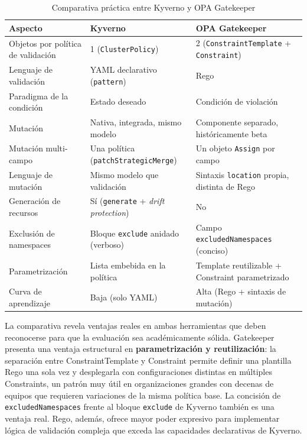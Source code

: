 \begin{table}[H]
\centering
\caption{Comparativa práctica entre Kyverno y OPA Gatekeeper}
\label{tab:kyverno-gatekeeper}
\small
\begin{tabular}{p{4.2cm} p{4.5cm} p{4.5cm}}
\toprule
\textbf{Aspecto} & \textbf{Kyverno} & \textbf{OPA Gatekeeper} \\
\midrule
Objetos por política de validación & 1 (\texttt{ClusterPolicy}) & 2 (\texttt{ConstraintTemplate} + \texttt{Constraint}) \\
\addlinespace
Lenguaje de validación & YAML declarativo (\texttt{pattern}) & Rego \\
\addlinespace
Paradigma de la condición & Estado deseado & Condición de violación \\
\addlinespace
Mutación & Nativa, integrada, mismo modelo & Componente separado, históricamente beta \\
\addlinespace
Mutación multi-campo & Una política (\texttt{patchStrategicMerge}) & Un objeto \texttt{Assign} por campo \\
\addlinespace
Lenguaje de mutación & Mismo modelo que validación & Sintaxis \texttt{location} propia, distinta de Rego \\
\addlinespace
Generación de recursos & Sí (\texttt{generate} + \textit{drift protection}) & No \\
\addlinespace
Exclusión de namespaces & Bloque \texttt{exclude} anidado (verboso) & Campo \texttt{excludedNamespaces} (conciso) \\
\addlinespace
Parametrización & Lista embebida en la política & Template reutilizable + Constraint parametrizado \\
\addlinespace
Curva de aprendizaje & Baja (solo YAML) & Alta (Rego + sintaxis de mutación) \\
\bottomrule
\end{tabular}
\end{table}

La comparativa revela ventajas reales en ambas herramientas que deben reconocerse para que la evaluación sea académicamente sólida. Gatekeeper presenta una ventaja estructural en \textbf{parametrización y reutilización}: la separación entre ConstraintTemplate y Constraint permite definir una plantilla Rego una sola vez y desplegarla con configuraciones distintas en múltiples Constraints, un patrón muy útil en organizaciones grandes con decenas de equipos que requieren variaciones de la misma política base. La concisión de \texttt{excludedNamespaces} frente al bloque \texttt{exclude} de Kyverno también es una ventaja real. Rego, además, ofrece mayor poder expresivo para implementar lógica de validación compleja que exceda las capacidades declarativas de Kyverno.

